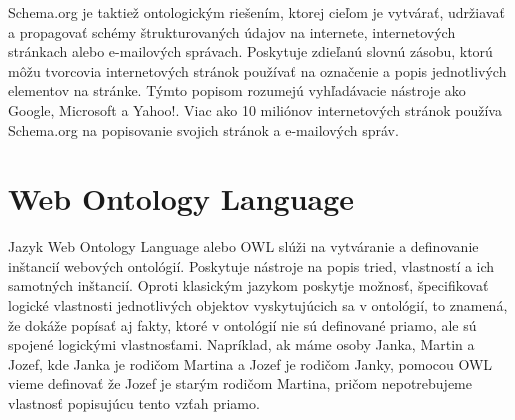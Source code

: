 \documentclass[12pt, a4paper, oneside]{book}
\begin{document}
Schema.org \cite{schemaOrg} je taktiež ontologickým riešením, ktorej cieľom je vytvárať, udržiavať a propagovať schémy štrukturovaných údajov na internete, internetových stránkach alebo e-mailových správach. Poskytuje zdieľanú slovnú zásobu, ktorú môžu tvorcovia internetových stránok používať na označenie a popis jednotlivých elementov na stránke. Týmto popisom rozumejú vyhľadávacie nástroje ako Google, Microsoft a Yahoo!. Viac ako 10 miliónov internetových stránok používa Schema.org na popisovanie svojich stránok a e-mailových správ.





\section{Web Ontology Language}
Jazyk Web Ontology Language alebo OWL slúži na vytváranie a definovanie inštancií webových ontológií. Poskytuje nástroje na popis tried, vlastností a ich samotných inštancií. Oproti klasickým jazykom poskytje možnosť, špecifikovať logické vlastnosti jednotlivých objektov vyskytujúcich sa v ontológií, to znamená, že dokáže popísať aj fakty, ktoré v ontológií nie sú definované priamo, ale sú spojené logickými vlastnosťami. Napríklad, ak máme osoby Janka, Martin a Jozef, kde Janka je rodičom Martina a Jozef je rodičom Janky, pomocou OWL vieme definovať že Jozef je starým rodičom Martina, pričom nepotrebujeme vlastnosť popisujúcu tento vzťah priamo.
\end{document}
